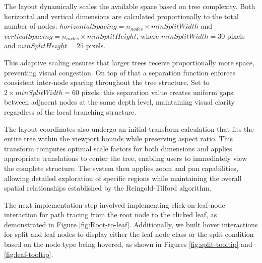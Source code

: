 The layout dynamically scales the available space based on tree complexity. Both horizontal and vertical dimensions are calculated proportionally to the total number of nodes: $horizontalSpacing = n_{nodes} \times minSplitWidth$ and $verticalSpacing = n_{nodes} \times minSplitHeight$, where $minSplitWidth = 30$ pixels and $minSplitHeight = 25$ pixels. 

This adaptive scaling ensures that larger trees receive proportionally more space, preventing visual congestion.
On top of that a separation function enforces consistent inter-node spacing throughout the tree structure. Set to $2 \times minSplitWidth = 60$ pixels, this separation value creates uniform gaps between adjacent nodes at the same depth level, maintaining visual clarity regardless of the local branching structure.

The layout coordinates also undergo an initial transform calculation that fits the entire tree within the viewport bounds while preserving aspect ratio. This transform computes optimal scale factors for both dimensions and applies appropriate translations to center the tree, enabling users to immediately view the complete structure. The system then applies zoom and pan capabilities, allowing detailed exploration of specific regions while maintaining the overall spatial relationships established by the Reingold-Tilford algorithm.

The next implementation step \cite{git2commit} involved implementing click-on-leaf-node interaction for path tracing from the root node to the clicked leaf, as demonstrated in Figure \ref{fig:Root-to-leaf}. Additionally, we built hover interactions for split and leaf nodes to display either the leaf node class or the split condition based on the node type being hovered, as shown in Figures \ref{fig:split-tooltip} and \ref{fig:leaf-tooltip}.

